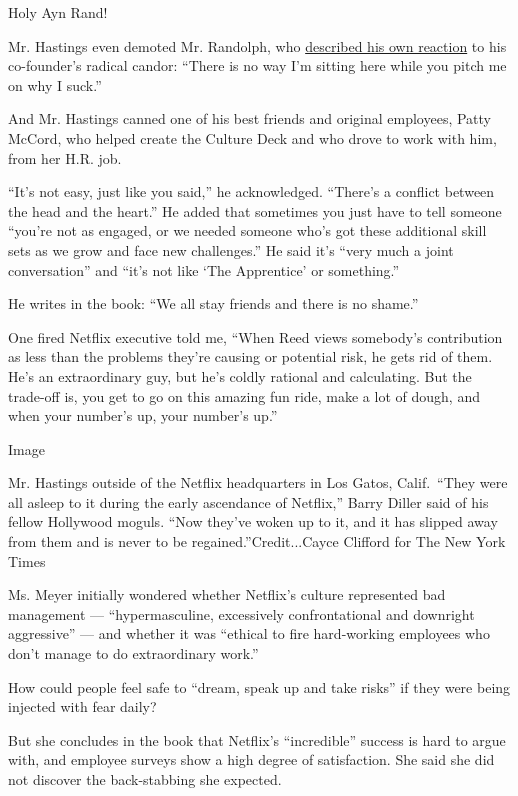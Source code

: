 Holy Ayn Rand!

Mr. Hastings even demoted Mr. Randolph, who
\href{https://www.nytimes3xbfgragh.onion/2019/09/15/business/media/netflix-chief-executive-reed-hastings-marc-randolph.html}{described
his own reaction} to his co-founder's radical candor: ``There is no way
I'm sitting here while you pitch me on why I suck.''

And Mr. Hastings canned one of his best friends and original employees,
Patty McCord, who helped create the Culture Deck and who drove to work
with him, from her H.R. job.

``It's not easy, just like you said,'' he acknowledged. ``There's a
conflict between the head and the heart.'' He added that sometimes you
just have to tell someone ``you're not as engaged, or we needed someone
who's got these additional skill sets as we grow and face new
challenges.'' He said it's ``very much a joint conversation'' and ``it's
not like `The Apprentice' or something.''

He writes in the book: ``We all stay friends and there is no shame.''

One fired Netflix executive told me, ``When Reed views somebody's
contribution as less than the problems they're causing or potential
risk, he gets rid of them. He's an extraordinary guy, but he's coldly
rational and calculating. But the trade-off is, you get to go on this
amazing fun ride, make a lot of dough, and when your number's up, your
number's up.''

Image

Mr. Hastings outside of the Netflix headquarters in Los Gatos,
Calif.~``They were all asleep to it during the early ascendance of
Netflix,'' Barry Diller said of his fellow Hollywood moguls. ``Now
they've woken up to it, and it has slipped away from them and is never
to be regained.''Credit...Cayce Clifford for The New York Times

Ms. Meyer initially wondered whether Netflix's culture represented bad
management --- ``hypermasculine, excessively confrontational and
downright aggressive'' --- and whether it was ``ethical to fire
hard-working employees who don't manage to do extraordinary work.''

How could people feel safe to ``dream, speak up and take risks'' if they
were being injected with fear daily?

But she concludes in the book that Netflix's ``incredible'' success is
hard to argue with, and employee surveys show a high degree of
satisfaction. She said she did not discover the back-stabbing she
expected.

